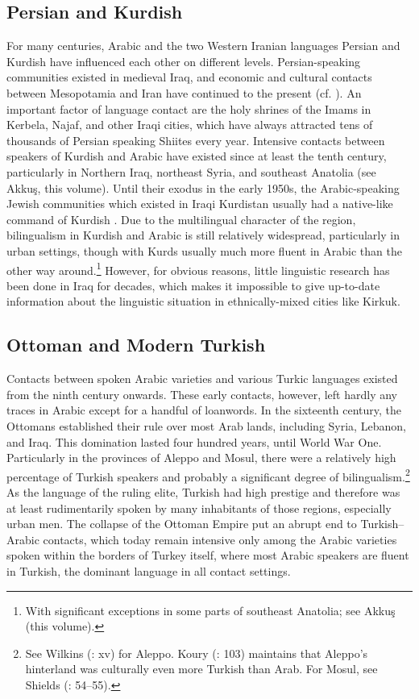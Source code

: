 \documentclass[output=paper]{langsci/langscibook}
\begin{document}
  \subsection{Persian and Kurdish} \label{persian} 
For many centuries, Arabic and the two Western Iranian languages Persian and Kurdish have influenced each other on different levels. Persian-speaking communities existed in medieval Iraq, and economic and cultural contacts between Mesopotamia and Iran have continued to the present (cf. \citealt{Gazsi2011}). An important factor of language contact are the holy shrines of the Imams in Kerbela, Najaf, and other Iraqi cities, which have always attracted tens of thousands of Persian speaking Shiites every year. Intensive contacts between speakers of Kurdish and Arabic have existed since at least the tenth century, particularly in Northern Iraq, northeast Syria, and southeast Anatolia (see Akkuş, this volume). Until their exodus in the early 1950s, the Arabic-speaking Jewish communities which existed in Iraqi Kurdistan usually had a native-like command of Kurdish \citep[12]{Jastrow1990chapter}. Due to the multilingual character of the region, bilingualism in Kurdish and Arabic is still relatively widespread, particularly in urban settings, though with Kurds usually much more fluent in Arabic than the other way around.\footnote{With significant exceptions in some parts of southeast Anatolia; see Akkuş (this volume).} However, for obvious reasons, little linguistic research has been done in Iraq for decades, which makes it impossible to give up-to-date information about the linguistic situation in ethnically-mixed cities like Kirkuk.

 \subsection{Ottoman and Modern Turkish} 
Contacts between spoken Arabic varieties and various Turkic languages existed from the ninth century onwards. These early contacts, however, left hardly any traces in Arabic except for a handful of loanwords. In the sixteenth century, the Ottomans established their rule over most Arab lands, including Syria, Lebanon, and Iraq. This domination lasted four hundred years, until World War One. Particularly in the provinces of Aleppo and Mosul, there were a relatively high percentage of Turkish speakers and probably a significant degree of bilingualism.\footnote{See Wilkins (\citeyear{Wilkins2010}: xv) for Aleppo. Koury (\citeyear{Khoury1987}: 103) maintains that Aleppo’s hinterland was culturally even more Turkish than Arab. For Mosul, see Shields (\citeyear{Shields2004}: 54--55).} As the language of the ruling elite, Turkish had high prestige and therefore was at least rudimentarily spoken by many inhabitants of those regions, especially urban men. The collapse of the Ottoman Empire put an abrupt end to Turkish--Arabic contacts, which today remain intensive only among the Arabic varieties spoken within the borders of Turkey itself, where most Arabic speakers are fluent in Turkish, the dominant language in all contact settings.
\end{document}

